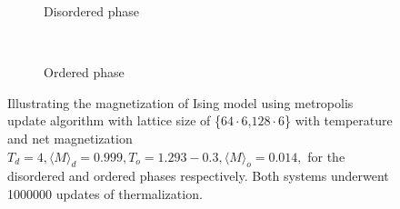 \documentclass[english,twoside,openright]{UH_TCM_MSc}
\begin{document}
\begin{figure}[htpb]
    \centering
    \begin{subfigure}[t]{0.5\textwidth}
        \centering
        \caption{Disordered phase}
    \end{subfigure}%
    ~ 
    \begin{subfigure}[t]{0.5\textwidth}
        \centering
        \caption{Ordered phase}
    \end{subfigure}
    \caption{Illustrating the magnetization of Ising model using metropolis update algorithm with lattice size of \{$64\cdot6$,$128\cdot6$\} with temperature and net magnetization $T_d=4, \langle M \rangle_d = 0.999,T_o=1.293 - 0.3,\langle M \rangle_o = 0.014,$ for the disordered and ordered phases respectively. Both systems underwent 1000000 updates of thermalization.}
    \label{fig:ising}
\end{figure}
\end{document}
